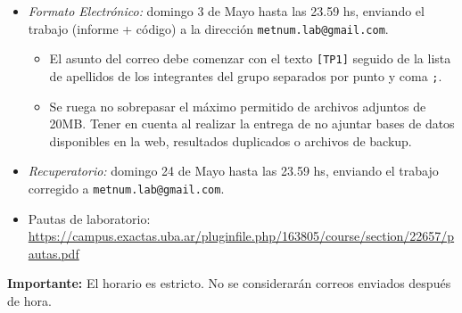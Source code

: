 \documentclass[11pt,a4paper]{article}
\begin{document}
\begin{itemize}
	\item \textit{Formato Electrónico:} domingo 3 de Mayo hasta las 23.59 hs, enviando el trabajo (informe + código) a la dirección \verb+metnum.lab@gmail.com+.
	\begin{itemize}
		\item   El asunto del correo debe comenzar con el texto \verb+[TP1]+  seguido de la lista de apellidos  de los integrantes del grupo separados por punto y coma \verb|;|.
		
		\item  Se ruega no sobrepasar el máximo permitido de archivos adjuntos de 20MB. Tener en cuenta al realizar la entrega de no ajuntar bases de datos disponibles en la web, resultados duplicados o archivos de backup.
	\end{itemize}
	

	\item \textit{Recuperatorio:} domingo 24 de Mayo hasta las 23.59 hs, enviando el trabajo corregido a \verb+metnum.lab@gmail.com+.
	
	\item Pautas de laboratorio:\\
	{\footnotesize \url{https://campus.exactas.uba.ar/pluginfile.php/163805/course/section/22657/pautas.pdf}}	
	
\end{itemize}

\noindent \textbf{Importante:} El horario es estricto. No se considerar\'an correos enviados despu\'es de hora.  




\end{document}
